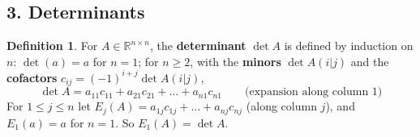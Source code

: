 \documentclass[12pt]{article}
\newcommand{\R}{\mathbb R}
\theoremstyle{definition}
\newtheorem{definition}[theorem]{Definition}
\begin{document}
\subsection*{3. Determinants}

\begin{definition}\label{b5.20}
For \(A\in\R^{n\times n}\), the \textbf{determinant} \(\det A\) is defined by induction on \(n\): \(\det(a)=a\) for
\(n=1\); for \(n\geqslant2\), with the \textbf{minors} \(\det A(i|j)\) and the \textbf{cofactors}
\(c_{ij}=(-1)^{i+j}\det A(i|j)\),
\[
\det A=a_{11}c_{11}+a_{21}c_{21}+\dots+a_{n1}c_{n1}\qquad\text{(expansion along column \(1\))}
\]
For \(1\leqslant j\leqslant n\) let \(E_j(A)=a_{1j}c_{1j}+\dots+a_{nj}c_{nj}\) (along column \(j\)), and \(E_1(a)=a\) for
\(n=1\). So \(E_1(A)=\det A\).
\end{definition}
\end{document}
